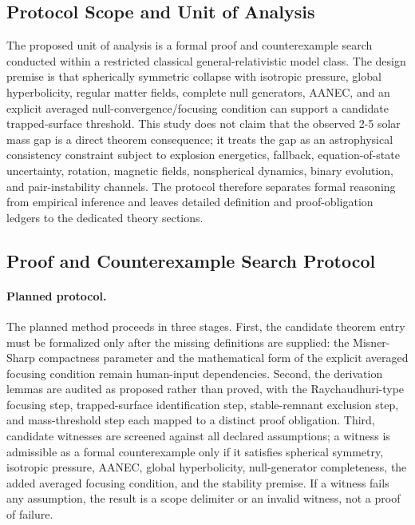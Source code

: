 \documentclass[conference]{IEEEtran}
\begin{document}
\subsection{Protocol Scope and Unit of Analysis}
The proposed unit of analysis is a formal proof and counterexample search conducted within a restricted classical general-relativistic model class. The design premise is that spherically symmetric collapse with isotropic pressure, global hyperbolicity, regular matter fields, complete null generators, AANEC, and an explicit averaged null-convergence/focusing condition can support a candidate trapped-surface threshold. This study does not claim that the observed 2-5 solar mass gap is a direct theorem consequence; it treats the gap as an astrophysical consistency constraint subject to explosion energetics, fallback, equation-of-state uncertainty, rotation, magnetic fields, nonspherical dynamics, binary evolution, and pair-instability channels. The protocol therefore separates formal reasoning from empirical inference and leaves detailed definition and proof-obligation ledgers to the dedicated theory sections.~\cite{cite_0ed84243cf171bc4,cite_7a407c865faafd11,cite_c369df652181e8f7,cite_fd0f77b2a173c0ab}

\subsection{Proof and Counterexample Search Protocol}
\paragraph{Planned protocol.} The planned method proceeds in three stages. First, the candidate theorem entry must be formalized only after the missing definitions are supplied: the Misner-Sharp compactness parameter and the mathematical form of the explicit averaged focusing condition remain human-input dependencies. Second, the derivation lemmas are audited as proposed rather than proved, with the Raychaudhuri-type focusing step, trapped-surface identification step, stable-remnant exclusion step, and mass-threshold step each mapped to a distinct proof obligation. Third, candidate witnesses are screened against all declared assumptions; a witness is admissible as a formal counterexample only if it satisfies spherical symmetry, isotropic pressure, AANEC, global hyperbolicity, null-generator completeness, the added averaged focusing condition, and the stability premise. If a witness fails any assumption, the result is a scope delimiter or an invalid witness, not a proof of failure.~\cite{cite_0ed84243cf171bc4,cite_37ecbded9d629353}
\end{document}

